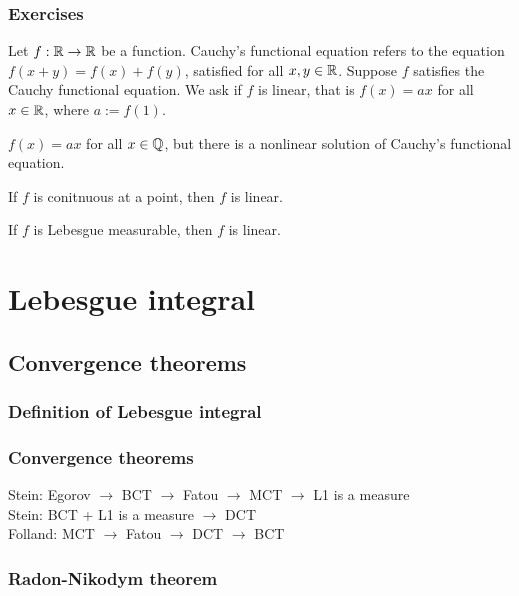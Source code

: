 \documentclass{../note}
\begin{document}
\section*{Exercises}
\begin{prb}
Let $f:\mathbb{R}\to\mathbb{R}$ be a function.
Cauchy's functional equation refers to the equation $f(x+y)=f(x)+f(y)$, satisfied for all $x,y\in\mathbb{R}$.
Suppose $f$ satisfies the Cauchy functional equation.
We ask if $f$ is linear, that is $f(x)=ax$ for all $x\in\mathbb{R}$, where $a:=f(1)$.
\begin{parts}
\item $f(x)=ax$ for all $x\in\mathbb{Q}$, but there is a nonlinear solution of Cauchy's functional equation.
\item If $f$ is conitnuous at a point, then $f$ is linear.
\item If $f$ is Lebesgue measurable, then $f$ is linear.
\end{parts}
\end{prb}









\part{Lebesgue integral}


\chapter{Convergence theorems}
\section{Definition of Lebesgue integral}
\section{Convergence theorems}

Stein: Egorov $\to$ BCT $\to$ Fatou $\to$ MCT $\to$ L1 is a measure\\
Stein: BCT + L1 is a measure $\to$ DCT\\
Folland: MCT $\to$ Fatou $\to$ DCT $\to$ BCT





\section{Radon-Nikodym theorem}
\end{document}
